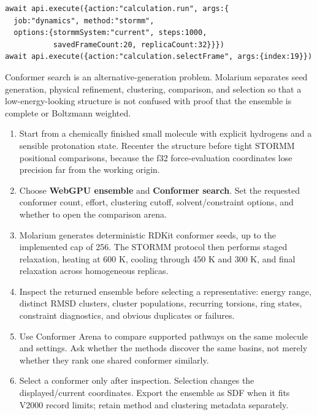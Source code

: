 \documentclass[11pt]{article}
\begin{document}
\begin{lstlisting}
await api.execute({action:"calculation.run", args:{
  job:"dynamics", method:"stormm",
  options:{stormmSystem:"current", steps:1000,
           savedFrameCount:20, replicaCount:32}}})
await api.execute({action:"calculation.selectFrame", args:{index:19}})
\end{lstlisting}


Conformer search is an alternative-generation problem. Molarium separates seed generation, physical refinement, clustering, comparison, and selection so that a low-energy-looking structure is not confused with proof that the ensemble is complete or Boltzmann weighted.


\begin{enumerate}
\item Start from a chemically finished small molecule with explicit hydrogens and a sensible protonation state. Recenter the structure before tight STORMM positional comparisons, because the f32 force-evaluation coordinates lose precision far from the working origin.
\item Choose \textbf{WebGPU ensemble} and \textbf{Conformer search}. Set the requested conformer count, effort, clustering cutoff, solvent/constraint options, and whether to open the comparison arena.
\item Molarium generates deterministic RDKit conformer seeds, up to the implemented cap of 256. The STORMM protocol then performs staged relaxation, heating at 600 K, cooling through 450 K and 300 K, and final relaxation across homogeneous replicas.
\item Inspect the returned ensemble before selecting a representative: energy range, distinct RMSD clusters, cluster populations, recurring torsions, ring states, constraint diagnostics, and obvious duplicates or failures.
\item Use Conformer Arena to compare supported pathways on the same molecule and settings. Ask whether the methods discover the same basins, not merely whether they rank one shared conformer similarly.
\item Select a conformer only after inspection. Selection changes the displayed/current coordinates. Export the ensemble as SDF when it fits V2000 record limits; retain method and clustering metadata separately.
\end{enumerate}
\end{document}
